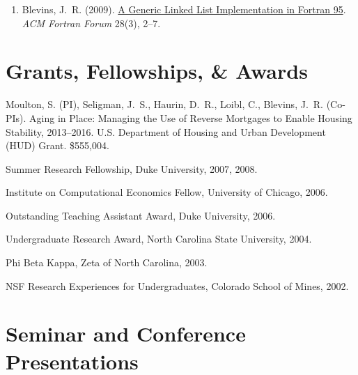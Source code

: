 \documentclass[10pt,letterpaper]{article}
\renewenvironment{itemize}{
  \begin{list}{}{
    \setlength{\leftmargin}{1.5em}
    \setlength{\itemsep}{0.25em}
    \setlength{\parskip}{0pt}
    \setlength{\parsep}{0.25em}
  }
}{
  \end{list}
}
\begin{document}
\begin{enumerate}[resume]
\item Blevins, J.~R. (2009).
  \href{http://jblevins.org/research/generic-list}{A Generic Linked List Implementation in Fortran 95}.
  \textit{ACM Fortran Forum} 28(3), 2--7.
\end{enumerate}

\section*{Grants, Fellowships, \& Awards}

\begin{itemize}
\item Moulton, S. (PI),
Seligman, J.~S., Haurin, D.~R., Loibl, C., Blevins, J.~R. (Co-PIs).
Aging in Place: Managing the Use of Reverse Mortgages to Enable Housing Stability,
2013--2016.
U.S. Department of Housing and Urban Development (HUD) Grant.
\$555,004.
\item Summer Research Fellowship, Duke University, 2007, 2008.
\item Institute on Computational Economics Fellow, University of Chicago, 2006.
\item Outstanding Teaching Assistant Award, Duke University, 2006.
\item Undergraduate Research Award, North Carolina State University, 2004.
\item Phi Beta Kappa, Zeta of North Carolina, 2003.
\item NSF Research Experiences for Undergraduates, Colorado School of Mines, 2002.
\end{itemize}

\section*{Seminar and Conference Presentations}
\end{document}
